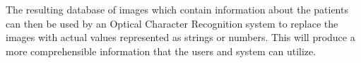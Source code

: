 The resulting database of images which contain information about the patients can then be used by an Optical Character Recognition system to replace the images with actual values represented as strings or numbers. This will produce a more comprehensible information that the users and system can utilize.

%
%
\begin{comment}
\begin{itemize}
\item  What is the relevance of your work to the computer science community? 

\begin{itemize} 
\item What will be your technical contributions, in terms of algorithms, or approaches, or new domain? 
\item What is your value-added compared to existing systems? 
\end{itemize}

\item What will be your contributions to society in general? 
    \begin{itemize}
      \item Who will benefit from your system? 
      \item Who are your target users and how will this system benefit them? 
   \end{itemize}
\end{itemize}

If applicable, describe possible commercialization and/or innovation in your research.
\end{comment}


